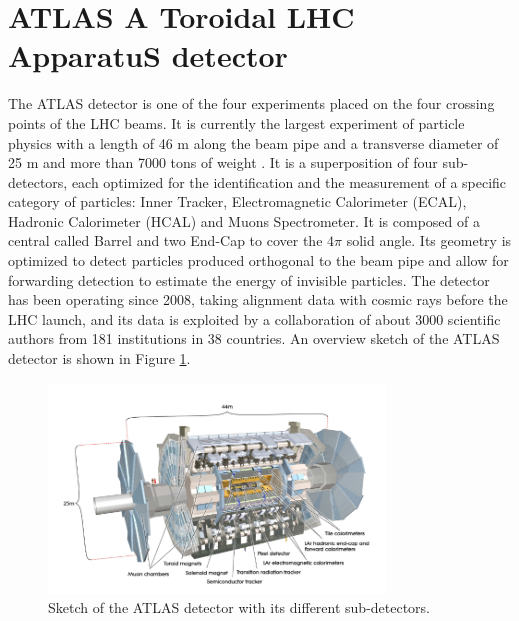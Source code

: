 \section{ATLAS A Toroidal LHC ApparatuS detector}
\label{chap2:ATLAS}
The ATLAS detector is one of the four experiments placed on the four crossing points of the LHC beams. It is currently the largest experiment of particle physics with a length of 46 m along the beam pipe and a transverse diameter of 25 m and more than 7000 tons of weight \cite{ATLAS_Exp}. It is a superposition of four sub-detectors, each optimized for the identification and the measurement of a specific category of particles: Inner Tracker, Electromagnetic Calorimeter (ECAL), Hadronic Calorimeter (HCAL) and Muons Spectrometer. It is composed of a central called Barrel and two End-Cap to cover the $4\pi$ solid angle. Its geometry is optimized to detect particles produced orthogonal to the beam pipe and allow for forwarding detection to estimate the energy of invisible particles. The detector has been operating since 2008, taking alignment data with cosmic rays before the LHC launch, and its data is exploited by a collaboration of about 3000 scientific authors from 181 institutions in 38 countries. An overview sketch of the ATLAS detector is shown in Figure \ref{fig:chap2:ATLAS:Img}.
\begin{figure}[htbp]
    \centering
    \includegraphics[width=0.8\textwidth]{Ch2/Img/ATLAS_sketch.png}
    \caption{Sketch of the ATLAS detector with its different sub-detectors.}
    \label{fig:chap2:ATLAS:Img}
\end{figure}

